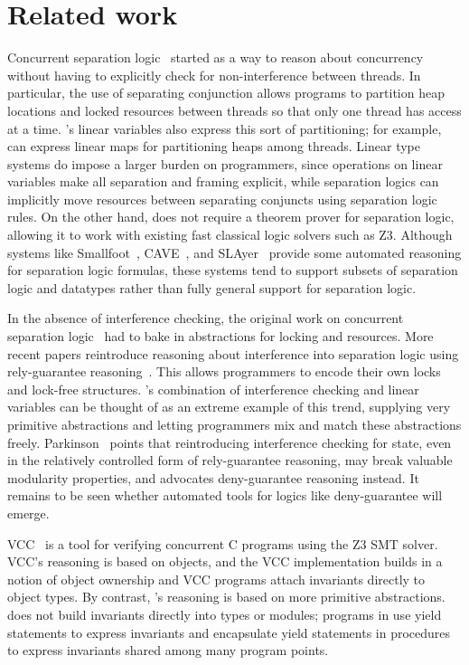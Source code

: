 \section{Related work}

Concurrent separation logic~\cite{OHearn07} started as a way to reason about concurrency without having to explicitly check for non-interference between threads.
In particular, the use of separating conjunction allows programs to partition heap locations and locked resources between threads so that only one thread has access at a time.
\civl's linear variables also express this sort of partitioning; for example, \civl can express linear maps for partitioning heaps among threads.
Linear type systems do impose a larger burden on programmers, since operations on linear variables make all separation and framing explicit, while separation logics can implicitly move resources between separating conjuncts using separation logic rules.
On the other hand, \civl does not require a theorem prover for separation logic, allowing it to work with existing fast classical logic solvers such as Z3.
Although systems like Smallfoot~\cite{Smallfoot}, CAVE~\cite{Cave}, and SLAyer~\cite{Slayer} provide some automated reasoning for separation logic formulas, these systems tend to support subsets of separation logic and datatypes rather than fully general support for separation logic.

In the absence of interference checking, the original work on concurrent separation logic~\cite{OHearn07} had to bake in abstractions for locking and resources.
More recent papers reintroduce reasoning about interference into separation logic using rely-guarantee reasoning~\cite{SAGL,RGSep}.
This allows programmers to encode their own locks and lock-free structures.
\civl's combination of interference checking and linear variables can be thought of as an extreme example of this trend, supplying very primitive abstractions and letting programmers mix and match these abstractions freely.
Parkinson~\cite{SepLog700} points that reintroducing interference checking for state, even in the relatively controlled form of rely-guarantee reasoning, may break valuable modularity properties, and advocates deny-guarantee reasoning instead.
It remains to be seen whether automated tools for logics like deny-guarantee will emerge.

VCC~\cite{VCC} is a tool for verifying concurrent C programs using the Z3 SMT solver.
VCC's reasoning is based on objects, and the VCC implementation builds in a notion of object ownership and VCC programs attach invariants directly to object types.
By contrast, \civl's reasoning is based on more primitive abstractions.  \civl does not build invariants directly into types or modules;
programs in \civl use yield statements to express invariants and encapsulate yield statements in procedures
to express invariants shared among many program points.

